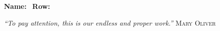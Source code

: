 \documentclass[12pt,fleqn]{exam}
\begin{document}
\newcommand{\reals}{\mathbf{R}}
\newcommand{\bi}{\mathbf{i}}
\newcommand{\bj}{\mathbf{j}}
\newcommand{\bk}{mathbf{k}}

\newcommand{\euler}{\mathrm{e}}
\newcommand{\ex}{1}
\newenvironment{alphalist}{
  \begin{enumerate}[(a)]
    \addtolength{\itemsep}{-1.0\itemsep}}
  {\end{enumerate}}

\newenvironment{handlist}{
  \begin{enumerate}[\leftthumbsup]
    \addtolength{\itemsep}{-1.0\itemsep}}
  {\end{enumerate}}

\vspace{0.1in}
\noindent{}
{\bf Name:}\hrulefill\
\noindent {}
{\bf Row:}\hrulefill\


\noindent \emph{“To pay attention, this is our endless and proper work.''} \hfill  \textsc{Mary Oliver}
\end{document}
